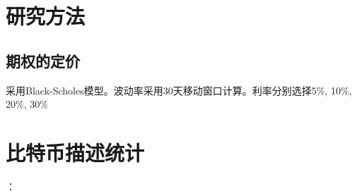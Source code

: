 \documentclass[UTF8]{ctexart}
\begin{document}
\section{研究方法}
    \subsection{期权的定价}
    采用Black-Scholes模型。波动率采用30天移动窗口计算。利率分别选择5\%, 10\%, 20\%, 30\%

\section{比特币描述统计}：

\end{document}
